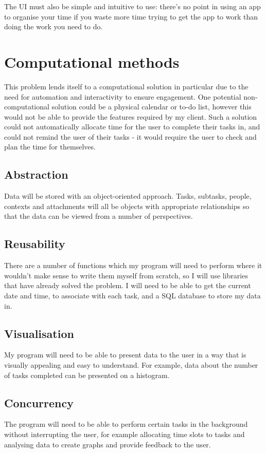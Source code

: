 \documentclass{article}
\begin{document}
The UI must also be simple and intuitive to use: there's no point in using an
app to organise your time if you waste more time trying to get the app to work
than doing the work you need to do.

\section{Computational methods}
This problem lends itself to a computational solution in particular due to the
need for automation and interactivity to ensure engagement. One potential
non-computational solution could be a physical calendar or to-do list, however
this would not be able to provide the features required by my client. Such a
solution could not automatically allocate time for the user to complete their
tasks in, and could not remind the user of their tasks - it would require the
user to check and plan the time for themselves.

\subsection{Abstraction}
Data will be stored with an object-oriented approach. Tasks, subtasks, people,
contexts and attachments will all be objects with appropriate relationships so
that the data can be viewed from a number of perspectives.

\subsection{Reusability}
There are a number of functions which my program will need to perform where it
wouldn't make sense to write them myself from scratch, so I will use libraries
that have already solved the problem. I will need to be able to get the current
date and time, to associate with each task, and a SQL database to store my data
in.

\subsection{Visualisation}
My program will need to be able to present data to the user in a way that is
visually appealing and easy to understand. For example, data about the number of
tasks completed can be presented on a histogram.

\subsection{Concurrency}
The program will need to be able to perform certain tasks in the background
without interrupting the user, for example allocating time slots to tasks and
analysing data to create graphs and provide feedback to the user.
\end{document}

